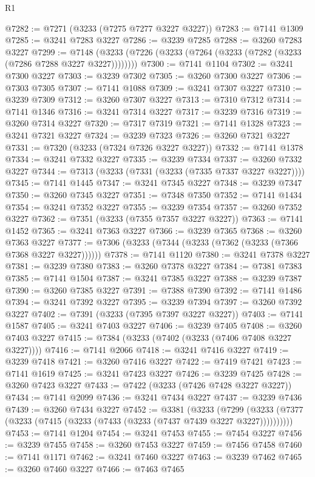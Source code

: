 \begin{lexlean}{R1}
\begin{coremodule}
@7282 := @7271 (@3233 (@7275 @7277 @3227 @3227))
@7283 := @7141 @1309
@7285 := @3241 @7283 @3227
@7286 := @3239 @7285
@7288 := @3260 @7283 @3227
@7299 := @7148 (@3233 (@7226 (@3233 (@7264 (@3233 (@7282 (@3233 (@7286 @7288 @3227 @3227))))))))
@7300 := @7141 @1104
@7302 := @3241 @7300 @3227
@7303 := @3239 @7302
@7305 := @3260 @7300 @3227
@7306 := @7303 @7305
@7307 := @7141 @1088
@7309 := @3241 @7307 @3227
@7310 := @3239 @7309
@7312 := @3260 @7307 @3227
@7313 := @7310 @7312
@7314 := @7141 @1346
@7316 := @3241 @7314 @3227
@7317 := @3239 @7316
@7319 := @3260 @7314 @3227
@7320 := @7317 @7319
@7321 := @7141 @1328
@7323 := @3241 @7321 @3227
@7324 := @3239 @7323
@7326 := @3260 @7321 @3227
@7331 := @7320 (@3233 (@7324 @7326 @3227 @3227))
@7332 := @7141 @1378
@7334 := @3241 @7332 @3227
@7335 := @3239 @7334
@7337 := @3260 @7332 @3227
@7344 := @7313 (@3233 (@7331 (@3233 (@7335 @7337 @3227 @3227))))
@7345 := @7141 @1445
@7347 := @3241 @7345 @3227
@7348 := @3239 @7347
@7350 := @3260 @7345 @3227
@7351 := @7348 @7350
@7352 := @7141 @1434
@7354 := @3241 @7352 @3227
@7355 := @3239 @7354
@7357 := @3260 @7352 @3227
@7362 := @7351 (@3233 (@7355 @7357 @3227 @3227))
@7363 := @7141 @1452
@7365 := @3241 @7363 @3227
@7366 := @3239 @7365
@7368 := @3260 @7363 @3227
@7377 := @7306 (@3233 (@7344 (@3233 (@7362 (@3233 (@7366 @7368 @3227 @3227))))))
@7378 := @7141 @1120
@7380 := @3241 @7378 @3227
@7381 := @3239 @7380
@7383 := @3260 @7378 @3227
@7384 := @7381 @7383
@7385 := @7141 @1504
@7387 := @3241 @7385 @3227
@7388 := @3239 @7387
@7390 := @3260 @7385 @3227
@7391 := @7388 @7390
@7392 := @7141 @1486
@7394 := @3241 @7392 @3227
@7395 := @3239 @7394
@7397 := @3260 @7392 @3227
@7402 := @7391 (@3233 (@7395 @7397 @3227 @3227))
@7403 := @7141 @1587
@7405 := @3241 @7403 @3227
@7406 := @3239 @7405
@7408 := @3260 @7403 @3227
@7415 := @7384 (@3233 (@7402 (@3233 (@7406 @7408 @3227 @3227))))
@7416 := @7141 @2066
@7418 := @3241 @7416 @3227
@7419 := @3239 @7418
@7421 := @3260 @7416 @3227
@7422 := @7419 @7421
@7423 := @7141 @1619
@7425 := @3241 @7423 @3227
@7426 := @3239 @7425
@7428 := @3260 @7423 @3227
@7433 := @7422 (@3233 (@7426 @7428 @3227 @3227))
@7434 := @7141 @2099
@7436 := @3241 @7434 @3227
@7437 := @3239 @7436
@7439 := @3260 @7434 @3227
@7452 := @3381
    (@3233
      (@7299 (@3233 (@7377 (@3233 (@7415 (@3233 (@7433 (@3233 (@7437 @7439 @3227 @3227))))))))))
@7453 := @7141 @1204
@7454 := @3241 @7453
@7455 := @7454 @3227
@7456 := @3239 @7455
@7458 := @3260 @7453 @3227
@7459 := @7456 @7458
@7460 := @7141 @1171
@7462 := @3241 @7460 @3227
@7463 := @3239 @7462
@7465 := @3260 @7460 @3227
@7466 := @7463 @7465

\end{coremodule}
\end{lexlean}
